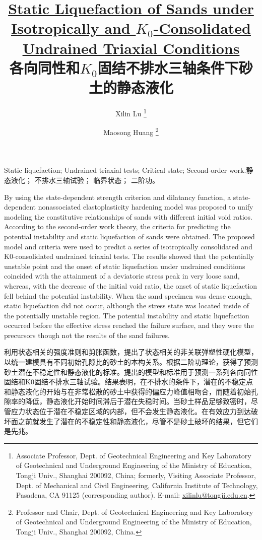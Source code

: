 \documentclass{bilidoc}
\title{\textbf{\href{https://doi.org/10.1061/(ASCE)GT.1943-5606.0001206}{Static Liquefaction of Sands under Isotropically and $K_0$-Consolidated Undrained Triaxial Conditions }\\各向同性和$K_0$固结不排水三轴条件下砂土的静态液化}}
\author{Xilin Lu \thanks{
    Associate Professor, Dept. of Geotechnical Engineering and Key Laboratory of Geotechnical and Underground Engineering of the Ministry of Education, Tongji Univ., Shanghai 200092, China; formerly, Visiting Associate Professor, Dept. of Mechanical and Civil Engineering, California Institute of Technology, Pasadena, CA 91125 (corresponding author). E-mail: \url{xilinlu@tongji.edu.cn}.
} \and Maosong Huang \thanks{
    Professor and Chair, Dept. of Geotechnical Engineering and Key Laboratory of Geotechnical and Underground Engineering of the Ministry of Education, Tongji Univ., Shanghai 200092, China.
}}
\date{}
\begin{document}
\maketitle

\begin{Abstract}{Static liquefaction; Undrained triaxial tests; Critical state; Second-order work.}{静态液化； 不排水三轴试验； 临界状态； 二阶功。}

    By using the state-dependent strength criterion and dilatancy function, a state-dependent nonassociated elastoplasticity hardening model was proposed to unify modeling the constitutive relationships of sands with different initial void ratios. According to the second-order work theory, the criteria for predicting the potential instability and static liquefaction of sands were obtained. The proposed model and criteria were used to predict a series of isotropically consolidated and K0-consolidated undrained triaxial tests. The results showed that the potentially unstable point and the onset of static liquefaction under undrained conditions coincided with the attainment of a deviatoric stress peak in very loose sand, whereas, with the decrease of the initial void ratio, the onset of static liquefaction fell behind the potential instability. When the sand specimen was dense enough, static liquefaction did not occur, although the stress state was located inside of the potentially unstable region. The potential instability and static liquefaction occurred before the effective stress reached the failure surface, and they were the precursors though not the results of the sand failures.

    \switchcolumn

    利用状态相关的强度准则和剪胀函数，提出了状态相关的非关联弹塑性硬化模型，以统一建模具有不同初始孔隙比的砂土的本构关系。根据二阶功理论，获得了预测砂土潜在不稳定性和静态液化的标准。提出的模型和标准用于预测一系列各向同性固结和K0固结不排水三轴试验。结果表明，在不排水的条件下，潜在的不稳定点和静态液化的开始与在非常松散的砂土中获得的偏应力峰值相吻合，而随着初始孔隙率的降低，静态液化开始时间滞后于潜在失稳时间。当砂土样品足够致密时，尽管应力状态位于潜在不稳定区域的内部，但不会发生静态液化。在有效应力到达破坏面之前就发生了潜在的不稳定性和静态液化，尽管不是砂土破坏的结果，但它们是先兆。
    
\end{Abstract}












\begin{multicols}{2}
    
\end{multicols}


    
\end{document}

